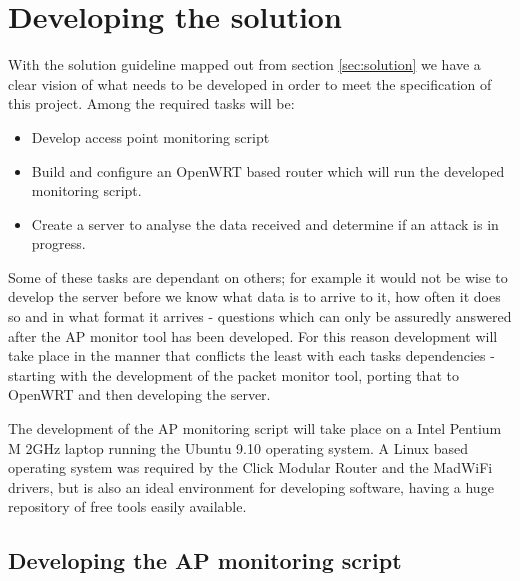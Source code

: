 \chapter{Developing the solution}

With the solution guideline mapped out from section \ref{sec:solution} we have a clear vision of what needs to be developed in order to meet the specification of this project. Among the required tasks will be:

\begin{itemize}
\item Develop access point monitoring script
\item Build and configure an OpenWRT based router which will run the developed monitoring script.
\item Create a server to analyse the data received and determine if an attack is in progress.
\end{itemize}

Some of these tasks are dependant on others; for example it would not be wise to develop the server before we know what data is to arrive to it, how often it does so and in what format it arrives - questions which can only be assuredly answered after the AP monitor tool has been developed. For this reason development will take place in the manner that conflicts the least with each tasks dependencies - starting with the development of the packet monitor tool, porting that to OpenWRT and then developing the server.

The development of the AP monitoring script will take place on a Intel\textsuperscript{\textregistered} Pentium\textsuperscript{\textregistered} M 2GHz laptop running the Ubuntu 9.10 operating system. A Linux based operating system was required by the Click Modular Router and the MadWiFi drivers, but is also an ideal environment for developing software, having a huge repository of free tools easily available.

\section{Developing the AP monitoring script}

